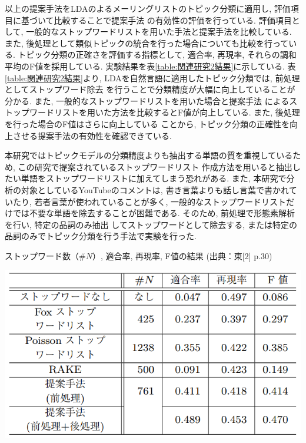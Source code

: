 \documentclass{ltjarticle}
\begin{document}
以上の提案手法をLDAのよるメーリングリストのトピック分類に適用し, 評価項目に基づいて比較することで提案手法
の有効性の評価を行っている. 評価項目として, 一般的なストップワードリストを用いた手法と提案手法を比較している. 
また, 後処理として類似トピックの統合を行った場合についても比較を行っている. 
トピック分類の正確さを評価する指標として, 適合率, 再現率, それらの調和平均のF値を採用している. 
実験結果を表\ref{table:関連研究2結果}に示している. 表\ref{table:関連研究2結果}より, LDAを自然言語に適用したトピック分類では, 前処理としてストップワード除去
を行うことで分類精度が大幅に向上していることが分かる. また, 一般的なストップワードリストを用いた場合と提案手法
によるストップワードリストを用いた方法を比較するとF値が向上している. また, 後処理を行った場合のF値はさらに向上している
ことから, トピック分類の正確性を向上させる提案手法の有効性を確認できている. 

本研究ではトピックモデルの分類精度よりも抽出する単語の質を重視しているため, この研究で提案されているストップワードリスト
作成方法を用いると抽出したい単語をストップワードリストに加えてしまう恐れがある. 
また, 本研究で分析の対象としているYouTubeのコメントは, 書き言葉よりも話し言葉で書かれていたり, 若者言葉が使われていることが多く, 
一般的なストップワードリストだけでは不要な単語を除去することが困難である. そのため, 前処理で形態素解析を行い, 特定の品詞のみ抽出
してストップワードとして除去する, または特定の品詞のみでトピック分類を行う手法で実験を行った. 
\begin{table}
    \centering
    \caption{ストップワード数（$\#N$）, 適合率, 再現率, F値の結果 (出典：東[2] p.30)}
    \vspace{5truept}
    \includegraphics[]{images/table2.png}
    \label{table:関連研究2結果}
\end{table}
\vspace{10truept}
\end{document}
